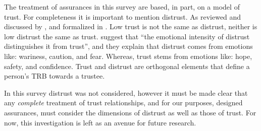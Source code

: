     The treatment of assurances in this survey are based, in part, on a model of trust. For completeness it is important to mention distrust. As reviewed and discussed by \citet{Lewicki1998-ox}, and formalized in \cite{McKnight2001-hm,McKnight2001-gz}. Low trust is not the same as distrust, neither is low distrust the same as trust. \citet{McKnight2001-gz} suggest that ``the emotional intensity of distrust distinguishes it from trust'', and they explain that distrust comes from emotions like: wariness, caution, and fear. Whereas, trust stems from emotions like: hope, safety, and confidence. Trust and distrust are orthogonal elements that define a person's TRB towards a trustee. %
%

%
%
    In this survey distrust was not considered, however it must be made clear that any \emph{complete} treatment of trust relationships, and for our purposes, designed assurances, must consider the dimensions of distrust as well as those of trust. For now, this investigation is left as an avenue for future research.
%
